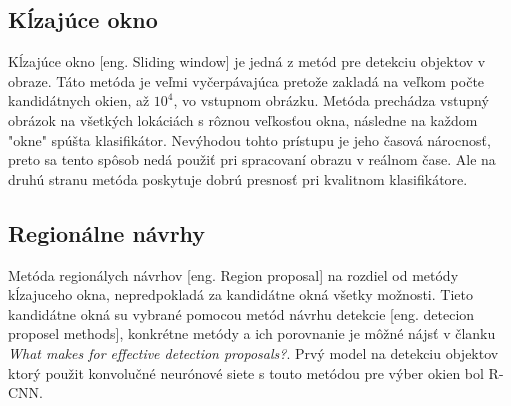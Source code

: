\begin{comment}
    \subsubsection{Vyhľadávač na základe vizuálnej podobnosti obrázkov}
    Jednu z možných aplikácií detekcie objektou v obraze využíva Pinterest\footnote{\url{https://medium.com/@Pinterest_Engineering/introducing-automatic-object-detection-to-visual-search-e57c29191c30}}.
    Používaju detekciu objektou pre indexovanie rôznych častí obrázka.
    Týmto spôsobom si môže užívateľ pri hľadaní npr. špecifickej kabelky alebo topánok nájsť aj jej podobné.
    \begin{figure}[H]
        \centering
        \texttt{[image: purse]}
        \caption{Prototyp automatického označovania a vyhľadávania objektov\cite{odkaz:ObjectDetectionOverview}}
        \label{pic:kNN}
    \end{figure}    
\end{comment}

\subsection{Kĺzajúce okno}
Kĺzajúce okno [eng. Sliding window] je jedná z metód pre detekciu objektov v obraze.
Táto metóda je veľmi vyčerpávajúca pretože zakladá na veľkom počte kandidátnych okien, až $10^4$, vo vstupnom obrázku.
Metóda prechádza vstupný obrázok na všetkých lokáciách s rôznou veľkosťou okna, následne na každom "okne" spúšta klasifikátor.
Nevýhodou tohto prístupu je jeho časová nárocnosť, preto sa tento spôsob nedá použiť pri spracovaní obrazu v reálnom čase.
Ale na druhú stranu metóda poskytuje dobrú presnosť pri kvalitnom klasifikátore\cite{prop:AutomaticHandgunDetection}.

\subsection{Regionálne návrhy}
Metóda regionálych návrhov [eng. Region proposal] na rozdiel od metódy kĺzajuceho okna, nepredpokladá za kandidátne okná všetky možnosti.
Tieto kandidátne okná su vybrané pomocou metód návrhu detekcie [eng. detecion proposel methods], konkrétne metódy
    a ich porovnanie je môžné nájsť v članku \textit{What makes for effective detection proposals?}\cite{prop:ProposalMethods}.
Prvý model na detekciu objektov ktorý použit konvolučné neurónové siete s touto metódou pre výber okien bol R-CNN\cite{prop:AutomaticHandgunDetection}.
